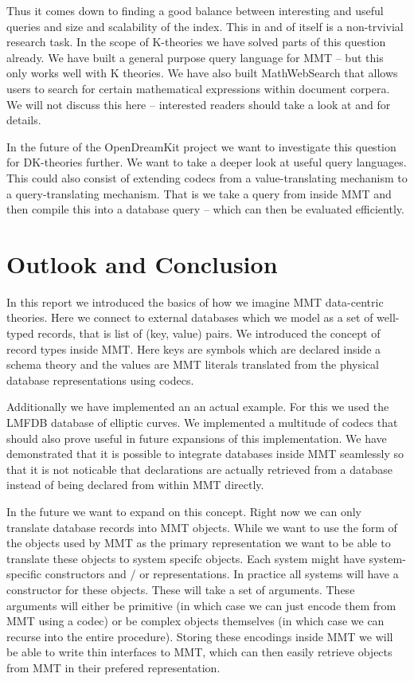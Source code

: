 \documentclass{deliverablereport}
\begin{document}
Thus it comes down to finding a good balance between interesting and useful queries and size and scalability of the index. This in and of itself is a non-trvivial research task. In the scope of K-theories we have solved parts of this question already. We have built a general purpose query language for MMT -- but this only works well with K theories. We have also built MathWebSearch that allows users to search for certain mathematical expressions within document corpera. We will not discuss this here -- interested readers should take a look at \cite{Rabe:qlfml12} and  for details.

In the future of the OpenDreamKit project we want to investigate this question for DK-theories further. We want to take a deeper look at useful query languages. This could also consist of extending codecs from a value-translating mechanism to a query-translating mechanism. That is we take a query from inside MMT and then compile this into a database query -- which can then be evaluated efficiently.

\section{Outlook and Conclusion}\label{sec:conclusion}

In this report we introduced the basics of how we imagine MMT data-centric theories. Here we connect to external databases which we model as a set of well-typed records, that is list of (key, value) pairs. We introduced the concept of record types inside MMT. Here keys are symbols which are declared inside a schema theory and the values are MMT literals translated from the physical database representations using codecs.

Additionally we have implemented an an actual example. For this we used the LMFDB database of elliptic curves. We implemented a multitude of codecs that should also prove useful in future expansions of this implementation. We have demonstrated that it is possible to integrate databases inside MMT seamlessly so that it is not noticable that declarations are actually retrieved from a database instead of being declared from within MMT directly.

In the future we want to expand on this concept. Right now we can only translate database records into MMT objects. While we want to use the form of the objects used by MMT as the primary representation we want to be able to translate these objects to system specifc objects. Each system might have system-specific constructors and / or representations. In practice all systems will have a constructor for these objects. These will take a set of arguments. These arguments will either be primitive (in which case we can just encode them from MMT using a codec) or be complex objects themselves (in which case we can recurse into the entire procedure). Storing these encodings inside MMT we will be able to write thin interfaces to MMT, which can then easily retrieve objects from MMT in their prefered representation.
\end{document}
